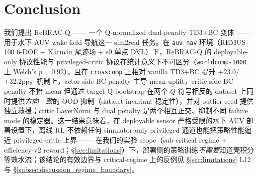 %
%

\section{Conclusion}\label{sec:conclusion}

我们提出 ReBRAC-Q —— 一个 Q-normalized dual-penalty TD3+BC 变体 —— 用于水下 AUV wake field 导航这一 sim2real 任务。在 \texttt{auv\_nav} 环境（REMUS-100 6-DOF + Kármán 尾迹场 + s0 单点 DVL）下，ReBRAC-Q 的 deployable-only 协议性能与 privileged-critic 协议在统计意义下不可区分（\texttt{worldcomp-1000} 上 Welch's $p = 0.92$），且在 \texttt{crosscomp} 上相对 vanilla TD3+BC 提升 $+23.0$/$+32.2$pp。机制上，actor-side BC penalty 主导 mean uplift，critic-side BC penalty 不抬 mean 但通过 target-Q bootstrap 在两个 $\hat{Q}$ 符号相反的 dataset 上同时提供\emph{方向一致}的 OOD 抑制（dataset-invariant 稳定性），并对 outlier seed 提供独立救援；critic LayerNorm 与 dual penalty 是两个相互正交、抑制不同 failure mode 的稳定器。这一结果意味着，在 deployable sensor 严格受限的水下 AUV 部署设置下，离线 RL 不依赖任何 simulator-only privileged 通道也能把策略性能逼近 privileged-critic 上界 —— 在我们的实验 scope（sub-critical regime + efficiency-v2 reward；\S\ref{sec:limitations}）下，部署侧的策略训练\emph{不需要}知道壳积分等效水流；该结论的有效边界与 critical-regime 上的反例见 \S\ref{sec:limitations} L12 与 \S\ref{subsec:discussion_regime_boundary}。
